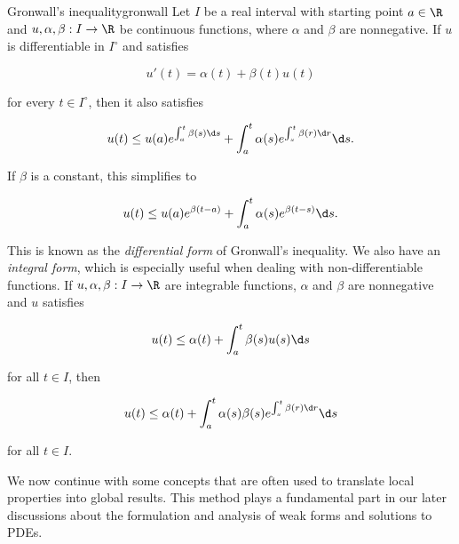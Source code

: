 \begin{lemma}{Gronwall's inequality}{gronwall}
    Let $I$ be a real interval with starting point $a \in \R$ and $u, \alpha, \beta: I \to \R$ be continuous functions, where $\alpha$ and $\beta$ are nonnegative. If $u$ is differentiable in $I^\circ$ and satisfies
    
    \begin{equation*}
        u'(t) = \alpha(t) + \beta(t) u(t)
    \end{equation*}
    
    \noindent
    for every $t \in I^\circ$, then it also satisfies

    \begin{equation*}
        u(t) \leq u(a)e^{\int_{a}^{t} \beta(s) \d s} + \int_{a}^{t} \alpha(s) e^{\int_{s}^{t} \beta(r) \d r} \d s .
    \end{equation*}

    \noindent
    If $\beta$ is a constant, this simplifies to

    \begin{equation*}
        u(t) \leq u(a)e^{\beta(t - a)} + \int_{a}^{t} \alpha(s) e^{\beta(t - s)} \d s .
    \end{equation*}

    \noindent
    This is known as the \emph{differential form} of Gronwall's inequality. We also have an \emph{integral form}, which is especially useful when dealing with non-differentiable functions. If $u, \alpha, \beta: I \to \R$ are integrable functions, $\alpha$ and $\beta$ are nonnegative and $u$ satisfies

    \begin{equation*}
        u(t) \leq \alpha(t) + \int_{a}^{t} \beta(s) u(s) \d s
    \end{equation*}

    \noindent
    for all $t \in I$, then

    \begin{equation*}
        u(t) \leq \alpha(t) + \int_{a}^{t} \alpha(s) \beta(s) e^{\int_{s}^{t} \beta(r) \d r} \d s
    \end{equation*}

    \noindent
    for all $t \in I$.
\end{lemma}

We now continue with some concepts that are often used to translate local properties into global results. This method plays a fundamental part in our later discussions about the formulation and analysis of weak forms and solutions to PDEs.

